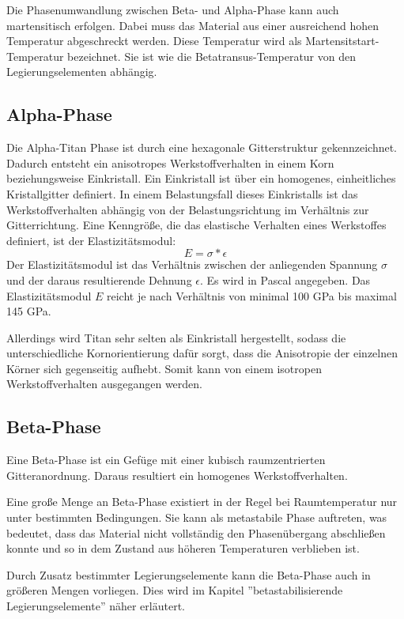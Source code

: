 \documentclass[a4paper, 11pt]{tubsreprt}
\begin{document}
Die Phasenumwandlung zwischen Beta- und Alpha-Phase kann auch martensitisch erfolgen. Dabei muss das Material aus einer ausreichend hohen Temperatur abgeschreckt werden. Diese Temperatur wird als Martensitstart-Temperatur bezeichnet. Sie ist wie die Betatransus-Temperatur von den Legierungselementen abhängig.  

\subsection{Alpha-Phase}
Die Alpha-Titan Phase ist durch eine hexagonale Gitterstruktur gekennzeichnet. Dadurch entsteht ein anisotropes Werkstoffverhalten in einem Korn beziehungsweise Einkristall.
Ein Einkristall ist über ein homogenes, einheitliches Kristallgitter definiert.
In einem Belastungsfall dieses Einkristalls ist das Werkstoffverhalten abhängig von der Belastungsrichtung im Verhältnis zur Gitterrichtung. Eine Kenngröße, die das elastische Verhalten eines Werkstoffes definiert, ist der Elastizitätsmodul: 
\begin{equation}
E=\sigma*\epsilon
\end{equation}
Der Elastizitätsmodul ist das Verhältnis zwischen der anliegenden Spannung $\sigma$ und der daraus resultierende Dehnung $\epsilon$.
Es wird in Pascal angegeben. Das Elastizitätsmodul $E$ reicht je nach Verhältnis von minimal 100 GPa bis maximal 145 GPa. 

Allerdings wird Titan sehr selten als Einkristall hergestellt, sodass die unterschiedliche Kornorientierung dafür sorgt, dass die Anisotropie der einzelnen Körner sich gegenseitig aufhebt. Somit kann von einem isotropen Werkstoffverhalten ausgegangen werden.


\subsection{Beta-Phase}
Eine Beta-Phase ist ein Gefüge mit einer kubisch raumzentrierten Gitteranordnung. Daraus resultiert ein homogenes Werkstoffverhalten.

Eine große Menge an Beta-Phase existiert in der Regel bei Raumtemperatur nur unter bestimmten Bedingungen. Sie kann als metastabile Phase auftreten, was bedeutet, dass das Material nicht vollständig den Phasenübergang abschließen konnte und so in dem Zustand aus höheren Temperaturen verblieben ist.  

Durch Zusatz bestimmter Legierungselemente kann die Beta-Phase auch in größeren Mengen vorliegen. Dies wird im Kapitel ''betastabilisierende Legierungselemente'' näher erläutert.
\ \\
\end{document}
